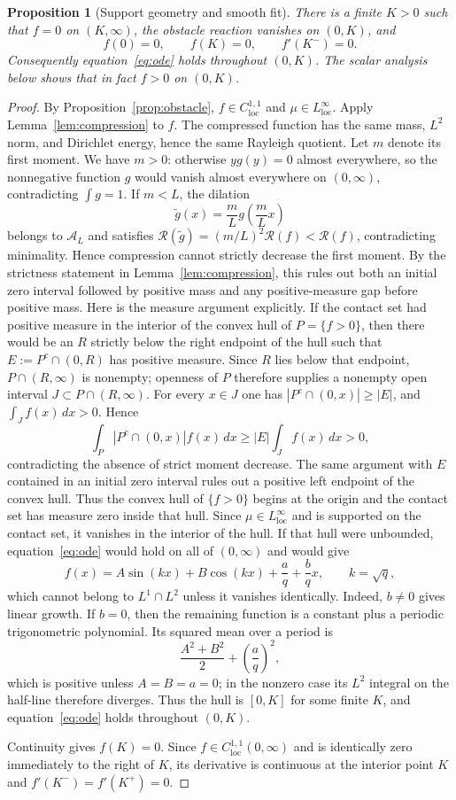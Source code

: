 \documentclass[11pt]{article}
\newtheorem{proposition}[theorem]{Proposition}
\theoremstyle{definition}
\theoremstyle{remark}
\newcommand{\A}{\mathcal A}
\newcommand{\Rcal}{\mathcal R}
\begin{document}
\begin{proposition}[Support geometry and smooth fit]\label{prop:geometry}
There is a finite $K>0$ such that $f=0$ on $(K,\infty)$, the obstacle reaction vanishes on $(0,K)$, and
\[
 f(0)=0,
 \qquad f(K)=0,
 \qquad f'(K^-)=0.
\]
Consequently equation~\eqref{eq:ode} holds throughout $(0,K)$. The scalar analysis below shows that in fact $f>0$ on $(0,K)$.
\end{proposition}
\begin{proof}
By Proposition~\ref{prop:obstacle}, $f\in C^{1,1}_{\mathrm{loc}}$ and $\mu\in L^\infty_{\mathrm{loc}}$. Apply Lemma~\ref{lem:compression} to $f$. The compressed function has the same mass, $L^2$ norm, and Dirichlet energy, hence the same Rayleigh quotient. Let $m$ denote its first moment. We have $m>0$: otherwise $yg(y)=0$ almost everywhere, so the nonnegative
function $g$ would vanish almost everywhere on $(0,\infty)$, contradicting
$\int g=1$. If $m<L$, the dilation
\[
 \widetilde g(x)=\frac{m}{L}g\left(\frac{m}{L}x\right)
\]
belongs to $\A_L$ and satisfies
$\Rcal(\widetilde g)=(m/L)^2\Rcal(f)<\Rcal(f)$, contradicting minimality.
Hence compression cannot strictly decrease the first moment. By the strictness
statement in Lemma~\ref{lem:compression}, this rules out both an initial zero
interval followed by positive mass and any positive-measure gap before
positive mass. Here is the measure argument explicitly. If the contact set
had positive measure in the interior of the convex hull of $P=\{f>0\}$, then
there would be an $R$ strictly below the right endpoint of the hull such that
$E:=P^c\cap(0,R)$ has positive measure. Since $R$ lies below that endpoint,
$P\cap(R,\infty)$ is nonempty; openness of $P$ therefore supplies a nonempty
open interval $J\subset P\cap(R,\infty)$.
For every $x\in J$ one has
$|P^c\cap(0,x)|\geq|E|$, and
$\int_J f(x)\,dx>0$. Hence
\[
 \int_P|P^c\cap(0,x)|f(x)\,dx
 \geq |E|\int_J f(x)\,dx>0,
\]
contradicting the absence of strict moment decrease. The same argument with
$E$ contained in an initial zero interval rules out a positive left endpoint
of the convex hull. Thus the convex hull of $\{f>0\}$ begins at the origin and
the contact set has measure zero inside that hull. Since
$\mu\in L^\infty_{\mathrm{loc}}$ and is supported on the contact set, it
vanishes in the interior of the hull. If that hull were unbounded,
equation~\eqref{eq:ode} would hold on all of $(0,\infty)$ and would give
\[
 f(x)=A\sin(kx)+B\cos(kx)+\frac{a}{q}+\frac{b}{q}x,
 \qquad k=\sqrt q,
\]
which cannot belong to $L^1\cap L^2$ unless it vanishes identically. Indeed,
$b\neq0$ gives linear growth. If $b=0$, then the remaining function is a
constant plus a periodic trigonometric polynomial. Its squared mean over a
period is
\[
 \frac{A^2+B^2}{2}+\left(\frac aq\right)^2,
\]
which is positive unless $A=B=a=0$; in the nonzero case its $L^2$ integral on
the half-line therefore diverges. Thus the hull is $[0,K]$ for some finite
$K$, and equation~\eqref{eq:ode} holds throughout $(0,K)$.

Continuity gives $f(K)=0$. Since
$f\in C^{1,1}_{\mathrm{loc}}(0,\infty)$ and is identically zero immediately
to the right of $K$, its derivative is continuous at the interior point $K$ and
$f'(K^-)=f'(K^+)=0$.
\end{proof}
\end{document}

